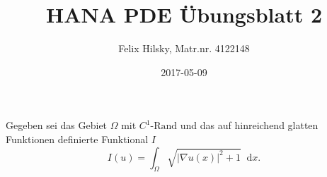 \documentclass{scrartcl}
\author{Felix Hilsky, Matr.nr. 4122148}
\title{HANA PDE Übungsblatt 2}
\date{2017-05-09}
\newcommand{\abs}[1]{\lvert #1 \rvert}
\newcommand{\d}{\mathop{} \mathrm{d}}
\begin{document}
  \maketitle


  Gegeben sei das Gebiet
  $\Omega$ mit
  $C^1\text{-Rand}$ und das auf hinreichend glatten Funktionen definierte Funktional $I$
  \begin{equation}
    I(u) = \int_{\Omega}
    \sqrt
    { \abs{ \nabla u (x) } ^ 2 + 1}
    \d x.
  \end{equation}
\end{document}
